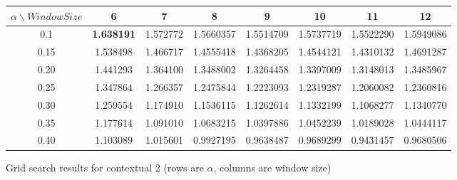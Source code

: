 \documentclass[a4paper,12pt]{article}
\begin{document}
\begin{figure}[htp]
	\centering
		\begin{tabular}{|c|c|c|c|c|c|c|c|}
		\hline
		$\alpha \backslash Window Size$ & 6 & 7 & 8 & 9 & 10 & 11 & 12 \\ \hline
		0.1 & \textbf{1.638191} & 1.572772 & 1.5660357 & 1.5514709 & 1.5737719 & 1.5522290 & 1.5949086 \\ \hline
		0.15 & 1.538498 & 1.466717 & 1.4555418 & 1.4368205 & 1.4544121 & 1.4310132 & 1.4691287 \\ \hline
		0.20 & 1.441293 & 1.364100 & 1.3488002 & 1.3264458 & 1.3397009 & 1.3148013 & 1.3485967 \\ \hline
		0.25 & 1.347864 & 1.266357 & 1.2475844 & 1.2223093 & 1.2319287 & 1.2060082 & 1.2360816 \\ \hline
		0.30 & 1.259554 & 1.174910 & 1.1536115 & 1.1262614 & 1.1332199 & 1.1068277 & 1.1340770 \\ \hline
		0.35 & 1.177614 & 1.091010 & 1.0683215 & 1.0397886 & 1.0452239 & 1.0189028 & 1.0444117 \\ \hline
		0.40 & 1.103089 & 1.015601 & 0.9927195 & 0.9638487 & 0.9689299 & 0.9431457 & 0.9680506 \\ \hline
		\end{tabular}
	\caption{Grid search results for contextual 2 (rows are $\alpha$, columns are window size)}
	\label{gridsearch2}
\end{figure}

\newpage


 
\end{document}
